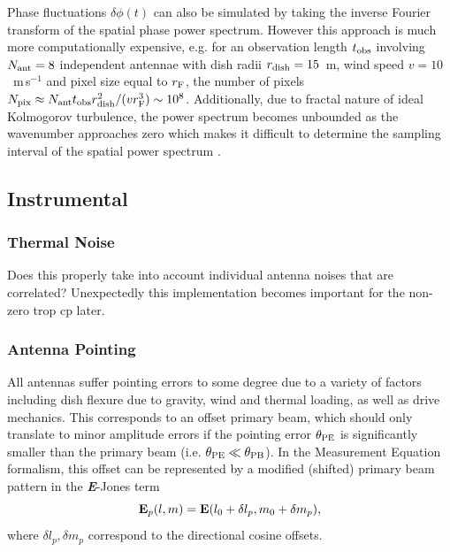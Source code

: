 Phase fluctuations $\delta\phi(t)$ can also be simulated by taking the inverse Fourier transform of the spatial phase power spectrum. However this approach is much more computationally expensive, e.g. for an observation length $t_{\rm obs}$ involving $N_{\rm ant}=8$ independent antennae with dish radii $r_{\rm dish}=15$~m, wind speed $v=10$~m\,s$^{-1}$ and pixel size equal to $r_{\rm F}$, the number of pixels $N_{\rm pix} \approx N_{\rm ant} t_{\rm obs} r_{\rm dish}^2/(v r_{\rm F}^3)  \sim 10^8$. Additionally, due to fractal nature of ideal Kolmogorov turbulence, the power spectrum becomes unbounded as the wavenumber approaches zero which makes it difficult to determine the sampling interval of the spatial power spectrum \citep{Lane_1992}. 


\subsection{Instrumental}

\subsubsection{Thermal Noise}

Does this properly take into account individual antenna noises that are correlated? Unexpectedly this implementation becomes important for the non-zero trop cp later.

\subsubsection{Antenna Pointing}
All antennas suffer pointing errors to some degree due to a variety of factors including dish flexure due to gravity, wind and thermal loading, as well as drive mechanics. This corresponds to an offset primary beam, which should only translate to minor amplitude errors if the pointing error $\theta_{\rm PE}$ is significantly smaller than the primary beam (i.e. $\theta_{\rm PE} \ll \theta_{\rm PB}$). In the Measurement Equation formalism, this offset can be represented by a modified (shifted) primary beam pattern in the {\bf \it E}-Jones term 
\begin{equation}
{\bf E}_p(l,m) = {\bf E}(l_0 + \delta l_p, m_0 + \delta m_p),
\end{equation}
where $\delta l_p, \delta m_p$ correspond to the directional cosine offsets.


